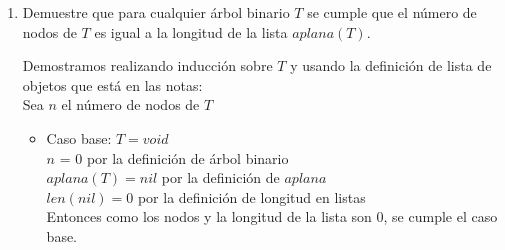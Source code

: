 \documentclass{article}
\begin{document}
\begin{enumerate}
{\begin{enumerate}
{		            Usando la definición de lista de objetos que está en las notas, podemos definir $aplana$ como:\\
                    
                    $aplana$ : Árbol binario c $\rightarrow \mathcal{L}$(c)\\
					$aplana$ ($void$) = $nil$\\
					$aplana$ $(tree \ T_1, c, T_2)$ = $cons(cons(aplana(T_1), c), aplana(T_2))$\\
					
En haskell sería algo así:
					
aplana :: Arbol a $\rightarrow $ [a]\\
aplana void = []\\
aplana (tree a t1 t2) = aplana t1 ++ [a] ++ aplana t2	\\				
					
                }
                \item {
                    Demuestre que para cualquier árbol binario $T$ se cumple que
                    el número de nodos de $T$ es igual a la longitud de la lista 
                    $aplana(T)$.
                    
                    Demostramos realizando inducción sobre $T$ y usando la definición de lista de objetos que está en las notas:\\
                    Sea $n$ el número de nodos de $T$
                    \begin{itemize}                    
                    \item {
                        Caso base: $T = void$\\
                        $n$ = 0 por la definición de árbol binario\\
                        $aplana(T) =  nil$ por la definición de $aplana$ \\
                        $len(nil) = 0$ por la definición de longitud en listas\\ Entonces como los nodos y la longitud de la lista son 0, se cumple el caso base.
                        
}
\end{itemize}}
\end{enumerate}}
\end{enumerate}
\end{document}
